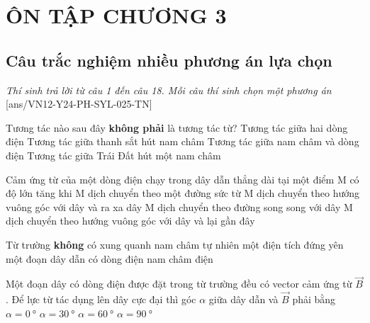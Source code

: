 \section{ÔN TẬP CHƯƠNG 3}
\subsection{Câu trắc nghiệm nhiều phương án lựa chọn}
\textit{Thí sinh trả lời từ câu 1 đến câu 18. Mỗi câu thí sinh chọn một phương án}
\setcounter{ex}{0}
[ans/VN12-Y24-PH-SYL-025-TN]
\begin{ex}
	Tương tác nào sau đây \textbf{không phải} là tương tác từ?
	\choice
	{Tương tác giữa hai dòng điện}
	{Tương tác giữa thanh sắt hút nam châm}
	{Tương tác giữa nam châm và dòng điện}
	{\True Tương tác giữa Trái Đất hút một nam châm}
	\loigiai{}
\end{ex}
\begin{ex}
	Cảm ứng từ của một dòng điện chạy trong dây dẫn thẳng dài tại một điểm M có độ lớn tăng khi
	\choice
	{M dịch chuyển theo một đường sức từ}
	{M dịch chuyển theo hướng vuông góc với dây và ra xa dây}
	{M dịch chuyển theo đường song song với dây}
	{\True M dịch chuyển theo hướng vuông góc với dây và lại gần đây}
	\loigiai{}
\end{ex}
\begin{ex}
	Từ trường \textbf{không} có xung quanh
	\choice
	{nam châm tự nhiên}
	{\True một điện tích đứng yên}
	{một đoạn dây dẫn có dòng điện}
	{nam châm điện}
	\loigiai{}
\end{ex}
\begin{ex}
	Một đoạn dây có dòng điện được đặt trong từ trường đều có vector cảm ứng từ $\vec{B}$. Để lực từ tác dụng lên dây cực đại thì góc $\alpha$ giữa dây dẫn và $\vec{B}$ phải bằng
	\choice
	{$\alpha=\SI{0}{\degree}$}
	{$\alpha=\SI{30}{\degree}$}
	{$\alpha=\SI{60}{\degree}$}
	{\True $\alpha=\SI{90}{\degree}$}
\end{ex}
